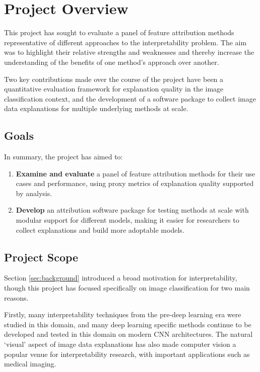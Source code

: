 \documentclass[main]{subfiles}
\begin{document}
\section{Project Overview}
This project has sought to evaluate a panel of feature attribution methods representative of different approaches to the interpretability problem. The aim was to highlight their relative strengths and weaknesses and thereby increase the understanding of the benefits of one method's approach over another.

Two key contributions made over the course of the project have been a quantitative evaluation framework for explanation quality in the image classification context, and the development of a software package to collect image data explanations for multiple underlying methods at scale.

\subsection*{Goals}
In summary, the project has aimed to:
\begin{enumerate}
	\item \textbf{Examine and evaluate} a panel of feature attribution methods for their use cases and performance, using proxy metrics of explanation quality supported by analysis.

	\item \textbf{Develop} an attribution software package for testing methods at scale with modular support for different models, making it easier for researchers to collect explanations and build more adoptable models.
	
\end{enumerate}


\newpage

\subsection*{Project Scope}

Section \ref{sec:background} introduced a broad motivation for interpretability, though this project has focused specifically on image classification for two main reasons.

Firstly, many interpretability techniques from the pre-deep learning era were studied in this domain, and many deep learning specific methods continue to be developed and tested in this domain on modern CNN architectures. The natural `visual' aspect of  image data explanations has also made computer vision a popular venue for interpretability research, with important applications such as medical imaging.
 
\end{document}
